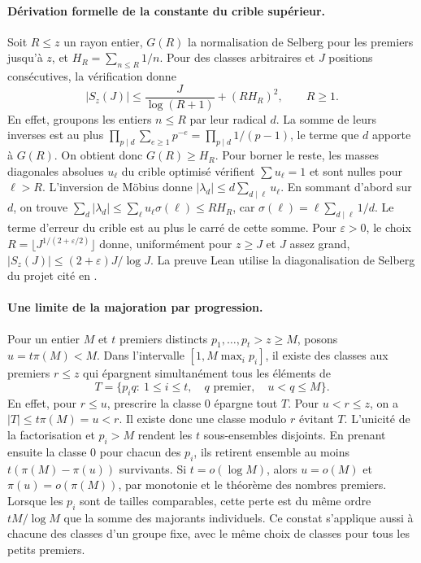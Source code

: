 \documentclass[11pt,a4paper]{article}
\begin{document}
\paragraph{Dérivation formelle de la constante du crible supérieur.}
Soit $R\le z$ un rayon entier, $G(R)$ la normalisation de Selberg pour
les premiers jusqu'à $z$, et $H_R=\sum_{n\le R}1/n$. Pour des classes
arbitraires et $J$ positions consécutives, la vérification donne
\[
     |S_z(J)|\le\frac{J}{\log(R+1)}+(R H_R)^2,\qquad R\ge1.
\]
En effet, groupons les entiers $n\le R$ par leur radical $d$.
La somme de leurs inverses est au plus
$\prod_{p\mid d}\sum_{e\ge1}p^{-e}=\prod_{p\mid d}1/(p-1)$,
le terme que $d$ apporte à $G(R)$. On obtient donc $G(R)\ge H_R$.
Pour borner le reste, les masses diagonales absolues $u_\ell$ du crible
optimisé vérifient $\sum u_\ell=1$ et sont nulles pour $\ell>R$.
L'inversion de Möbius donne
$|\lambda_d|\le d\sum_{d\mid\ell}u_\ell$. En sommant d'abord sur $d$,
on trouve $\sum_d|\lambda_d|\le\sum_\ell u_\ell\sigma(\ell)\le R H_R$,
car $\sigma(\ell)=\ell\sum_{d\mid\ell}1/d$. Le terme d'erreur du
crible est au plus le carré de cette somme. Pour $\varepsilon>0$, le
choix $R=\lfloor J^{1/(2+\varepsilon/2)}\rfloor$ donne, uniformément
pour $z\ge J$ et $J$ assez grand,
$|S_z(J)|\le (2+\varepsilon)J/\log J$. La preuve Lean utilise la
diagonalisation de Selberg du projet cité en \cite{survivors}.

\paragraph{Une limite de la majoration par progression.}
Pour un entier $M$ et $t$ premiers distincts $p_1,\ldots,p_t>z\ge M$,
posons $u=t\pi(M)<M$. Dans l'intervalle $[1,M\max_i p_i]$, il existe
des classes aux premiers $r\le z$ qui épargnent simultanément tous
les éléments de
\[
 T=\{p_iq:\ 1\le i\le t,\quad q\text{ premier},\quad u<q\le M\}.
\]
En effet, pour $r\le u$, prescrire la classe $0$ épargne tout $T$.
Pour $u<r\le z$, on a $|T|\le t\pi(M)=u<r$. Il existe donc une classe
modulo $r$ évitant $T$. L'unicité de la factorisation et $p_i>M$
rendent les $t$ sous-ensembles disjoints. En prenant ensuite la classe
$0$ pour chacun des $p_i$, ils retirent ensemble au moins
$t(\pi(M)-\pi(u))$ survivants. Si $t=o(\log M)$, alors $u=o(M)$
et $\pi(u)=o(\pi(M))$, par monotonie et le théorème des nombres
premiers. Lorsque les $p_i$ sont de tailles comparables, cette perte
est du même ordre $tM/\log M$ que la somme des majorants individuels.
Ce constat s'applique aussi à chacune des classes d'un groupe fixe,
avec le même choix de classes pour tous les petits premiers.
\end{document}
